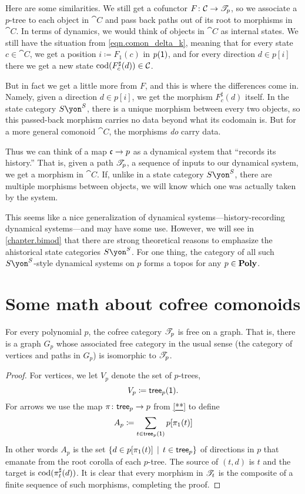 \documentclass[Book-Poly]{subfiles}
\begin{document}
Here are some similarities. We still get a cofunctor $F\colon\mathcal{C}\to\mathscr{T}_{p}$, so we associate a $p$-tree to each object in $\cat{C}$ and pass back paths out of its root to morphisms in $\cat{C}$. In terms of dynamics, we would think of objects in $\cat{C}$ as internal states. We still have the situation from \eqref{eqn.comon_delta_k}, meaning that for every state $c\in\cat{C}$, we get a position $i\coloneqq F_1(c)$ in $p(\textsf{1})$, and for every direction $d\in p[i]$ there we get a new state $\operatorname{cod}(F^\sharp_c(d))\in\mathcal{C}$. 

But in fact we get a little more from $F$, and this is where the differences come in. Namely, given a direction $d\in p[i]$, we get the morphism $F^\sharp_c(d)$ itself. In the state category $S\yon^S$, there is a unique morphism between every two objects, so this passed-back morphism carries no data beyond what its codomain is. But for a more general comonoid $\cat{C}$, the morphisms \emph{do} carry data. 

Thus we can think of a map $\mathfrak{c}\to p$ as a dynamical system that ``records its history.'' That is, given a path $\mathscr{T}_{p}$, a sequence of inputs to our dynamical system, we get a morphism in $\cat{C}$. If, unlike in a state category $S\yon^S$, there are multiple morphisms between objects, we will know which one was actually taken by the system.

This seems like a nice generalization of dynamical systems---history-recording dynamical systems---and may have some use. However, we will see in \cref{chapter.bimod} that there are strong theoretical reasons to emphasize the ahistorical state categories $S\yon^S$. For one thing, the category of all such $S\yon^S$-style dynamical systems on $p$ forms a topos for any $p\in\mathbf{Poly}$.


\section{Some math about cofree comonoids}

\begin{proposition}\label{prop.cofree_free_on_graph}
For every polynomial $p$, the cofree category $\mathscr{T}_{p}$ is free on a graph. That is, there is a graph $G_p$ whose associated free category in the usual sense (the category of vertices and paths in $G_p$) is isomorphic to $\mathscr{T}_{p}$.
\end{proposition}
\begin{proof}
For vertices, we let $V_p$ denote the set of $p$-trees,
\[V_p\coloneqq\mathsf{tree}_p(\textsf{1}).\]
For arrows we use the map $\pi\colon\mathsf{tree}_p\to p$ from \cref{**} to define
\[
A_p\coloneqq\sum_{t\in\mathsf{tree}_p(\textsf{1})}p[\pi_1(t)]
\]
In other words $A_p$ is the set $\{d\in p[\pi_1(t)]\,\mid\,t\in\mathsf{tree}_p\}$ of directions in $p$ that emanate from the root corolla of each $p$-tree. The source of $(t,d)$ is $t$ and the target is $\operatorname{cod}(\pi^\sharp_t(d))$. It is clear that every morphism in $\mathscr{T}_{t}$ is the composite of a finite sequence of such morphisms, completing the proof.
\end{proof}
\end{document}
